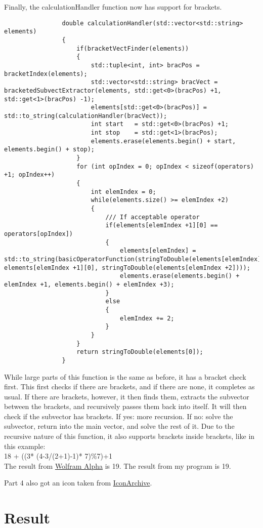 \documentclass{article}
\begin{document}
			Finally, the calculationHandler function now has support for brackets.
			\begin{lstlisting}
				double calculationHandler(std::vector<std::string> elements)
				{
					if(bracketVectFinder(elements))
					{
						std::tuple<int, int> bracPos = bracketIndex(elements);
						std::vector<std::string> bracVect = bracketedSubvectExtractor(elements, std::get<0>(bracPos) +1, std::get<1>(bracPos) -1);
						elements[std::get<0>(bracPos)] = std::to_string(calculationHandler(bracVect));
						int start   = std::get<0>(bracPos) +1;
						int stop    = std::get<1>(bracPos);
						elements.erase(elements.begin() + start,     elements.begin() + stop);
					}
					for (int opIndex = 0; opIndex < sizeof(operators) +1; opIndex++)
					{
						int elemIndex = 0;
						while(elements.size() >= elemIndex +2)
						{
							/// If acceptable operator
							if(elements[elemIndex +1][0] == operators[opIndex])
							{
								elements[elemIndex] = std::to_string(basicOperatorFunction(stringToDouble(elements[elemIndex]), elements[elemIndex +1][0], stringToDouble(elements[elemIndex +2])));
								elements.erase(elements.begin() + elemIndex +1, elements.begin() + elemIndex +3);
							}
							else
							{
								elemIndex += 2;
							}
						}
					}
					return stringToDouble(elements[0]);
				}
			\end{lstlisting}
			While large parts of this function is the same as before, it has a bracket check first. This first checks if there are brackets, and if there are none, it completes as usual. If there are brackets, however, it then finds them, extracts the subvector between the brackets, and recursively passes them back into itself. It will then check if the subvector has brackets. If yes: more recursion. If no: solve the subvector, return into the main vector, and solve the rest of it. Due to the recursive nature of this function, it also supports brackets inside brackets, like in this example: \\
			18 + ((3* (4-3/(2+1)-1)* 7)\%7)+1 \\
			The result from
			\href{http://www.wolframalpha.com/input/?i=18+\%2B+((3*+(4-3\%2F(2\%2B1)-1)*+7)\%257)\%2B1}{Wolfram Alpha}
			is 19. The result from my program is 19.
			
			Part 4 also got an icon taken from
			\href{http://www.iconarchive.com/show/sevenesque-icons-by-tristan-edwards/Calculator-icon.html}{IconArchive}.
	
	
	\section{Result}
\end{document}
